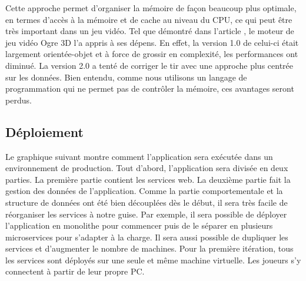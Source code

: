 \documentclass[12pt]{article}
\begin{document}


Cette approche permet d'organiser la mémoire de façon beaucoup plus optimale, en termes d'accès à la mémoire et de cache au niveau du CPU, ce qui peut être très important dans un jeu vidéo. Tel que démontré dans l'article \cite{DOD_Game_Engine}, le moteur de jeu vidéo Ogre 3D l'a appris à ses dépens. En effet, la version 1.0 de celui-ci était largement orientée-objet et à force de grossir en complexité, les performances ont diminué. La version 2.0 a tenté de corriger le tir avec une approche plus centrée sur les données. Bien entendu, comme nous utilisons un langage de programmation qui ne permet pas de contrôler la mémoire, ces avantages seront perdus.

\subsection{Déploiement}

Le graphique suivant montre comment l'application sera exécutée dans un environnement de production. Tout d'abord, l'application sera divisée en deux parties. La première partie contient les services web. La deuxième partie fait la gestion des données de l'application. Comme la partie comportementale et la structure de données ont été bien découplées dès le début, il sera très facile de réorganiser les services à notre guise. Par exemple, il sera possible de déployer l'application en monolithe pour commencer puis de le séparer en plusieurs microservices pour s'adapter à la charge. Il sera aussi possible de dupliquer les services et d'augmenter le nombre de machines. Pour la première itération, tous les services sont déployés sur une seule et même machine virtuelle. Les joueurs s'y connectent à partir de leur propre PC.
\end{document}
